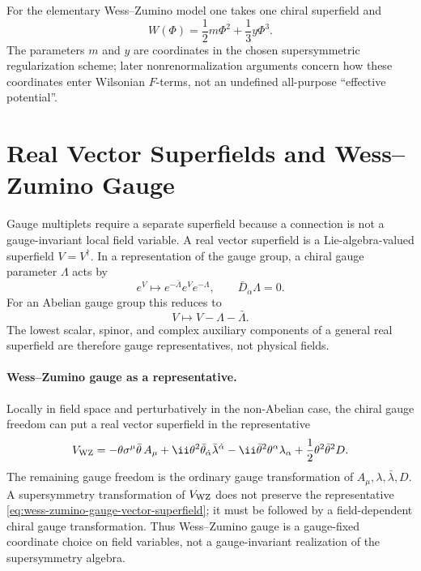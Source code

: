 For the elementary Wess--Zumino model one takes one chiral superfield and
\[
  W(\Phi)=\frac12m\Phi^2+\frac13 y\Phi^3 .
\]
The parameters \(m\) and \(y\) are coordinates in the chosen supersymmetric
regularization scheme; later nonrenormalization arguments concern how these
coordinates enter Wilsonian \(F\)-terms, not an undefined all-purpose
``effective potential''.

\section{Real Vector Superfields and Wess--Zumino Gauge}

Gauge multiplets require a separate superfield because a connection is not a
gauge-invariant local field variable.  A real vector superfield is a
Lie-algebra-valued superfield \(V=V^\dagger\).  In a representation of the
gauge group, a chiral gauge parameter \(\Lambda\) acts by
\[
  e^V\longmapsto e^{-\bar\Lambda}e^Ve^{-\Lambda},
  \qquad
  \bar D_{\dot\alpha}\Lambda=0 .
\]
For an Abelian gauge group this reduces to
\[
  V\longmapsto V-\Lambda-\bar\Lambda .
\]
The lowest scalar, spinor, and complex auxiliary components of a general real
superfield are therefore gauge representatives, not physical fields.

\paragraph{Wess--Zumino gauge as a representative.}
Locally in field space and perturbatively in the non-Abelian case, the chiral
gauge freedom can put a real vector superfield in the representative
\begin{equation}
  V_{\rm WZ}
  =
  -\theta\sigma^\mu\bar\theta\,A_\mu
  +\ii\theta^2\bar\theta_{\dot\alpha}\bar\lambda^{\dot\alpha}
  -\ii\bar\theta^2\theta^\alpha\lambda_\alpha
  +\frac12\theta^2\bar\theta^2D .
  \label{eq:wess-zumino-gauge-vector-superfield}
\end{equation}
The remaining gauge freedom is the ordinary gauge transformation of
\(A_\mu,\lambda,\bar\lambda,D\).  A supersymmetry transformation of
\(V_{\rm WZ}\) does not preserve the representative
\eqref{eq:wess-zumino-gauge-vector-superfield}; it must be followed by a
field-dependent chiral gauge transformation.  Thus Wess--Zumino gauge is a
gauge-fixed coordinate choice on field variables, not a gauge-invariant
realization of the supersymmetry algebra.

